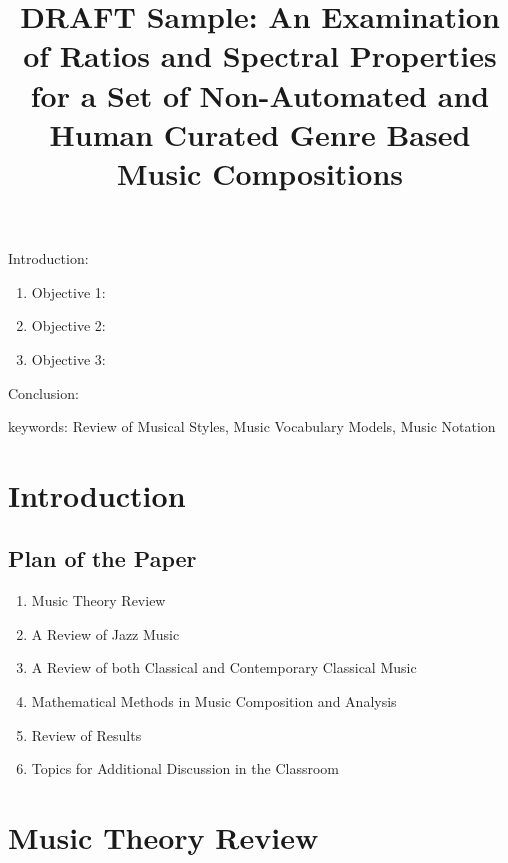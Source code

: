 


\twocolumn
\scriptsize
\begin{frontmatter}
		\title{DRAFT Sample: An Examination of Ratios and Spectral Properties for a Set of Non-Automated and Human Curated Genre Based Music Compositions}
		\author{}
		\address{The Mathematical Learning Space}
\end{frontmatter}	

Introduction:
\begin{enumerate}
\item Objective 1:
\item Objective 2:
\item Objective 3:
\end{enumerate}
Conclusion:

keywords: Review of Musical Styles, Music Vocabulary Models, Music Notation

\section{Introduction}

\subsection{Plan of the Paper}

\begin{enumerate}
\item Music Theory  Review
\item A Review of Jazz Music
\item A Review of both Classical and Contemporary Classical Music
\item Mathematical Methods in Music Composition and Analysis
\item Review of Results
\item Topics for Additional Discussion in the Classroom
\end{enumerate}

\section{Music Theory Review}

